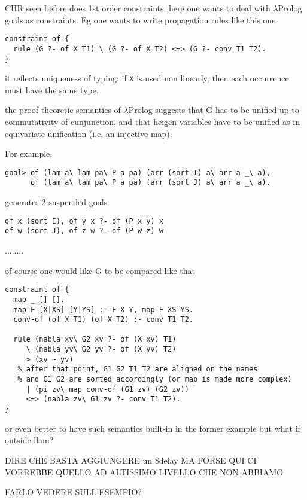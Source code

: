 \documentclass{easychair}
\begin{document}
CHR seen before does 1st order constraints, here one wants to deal
with $\lambda$Prolog goals as constraints.  Eg one wants to write  propagation
rules like this one

\begin{verbatim}
constraint of {
  rule (G ?- of X T1) \ (G ?- of X T2) <=> (G ?- conv T1 T2).
}
\end{verbatim}

it reflects uniqueness of typing: if \verb+X+ is used non linearly,
then each occurrence must have the same type.

the proof theoretic semantics of $\lambda$Prolog suggests that G has to be unified
up to commutativity of cunjunction, and that heigen variables have to
be unified as in equivariate unification (i.e. an injective map).

For example,


\begin{verbatim}
goal> of (lam a\ lam pa\ P a pa) (arr (sort I) a\ arr a _\ a),
      of (lam a\ lam pa\ P a pa) (arr (sort J) a\ arr a _\ a).
\end{verbatim}

generates 2 suspended goals

\begin{verbatim}
of x (sort I), of y x ?- of (P x y) x
of w (sort J), of z w ?- of (P w z) w
\end{verbatim}

........

of course one would like G to be compared like that

\begin{verbatim}
constraint of {
  map _ [] [].
  map F [X|XS] [Y|YS] :- F X Y, map F XS YS.
  conv-of (of X T1) (of X T2) :- conv T1 T2.

  rule (nabla xv\ G2 xv ?- of (X xv) T1)
     \ (nabla yv\ G2 yv ?- of (X yv) T2)
     > (xv ~ yv)
   % after that point, G1 G2 T1 T2 are aligned on the names
   % and G1 G2 are sorted accordingly (or map is made more complex)
     | (pi zv\ map conv-of (G1 zv) (G2 zv))
     <=> (nabla zv\ G1 zv ?- conv T1 T2).
}
\end{verbatim}

or even better to have such semantics built-in in the former example
but what if outside llam?


DIRE CHE BASTA AGGIUNGERE un \$delay MA FORSE QUI CI VORREBBE QUELLO AD ALTISSIMO LIVELLO CHE NON ABBIAMO

FARLO VEDERE SULL'ESEMPIO?
\end{document}
